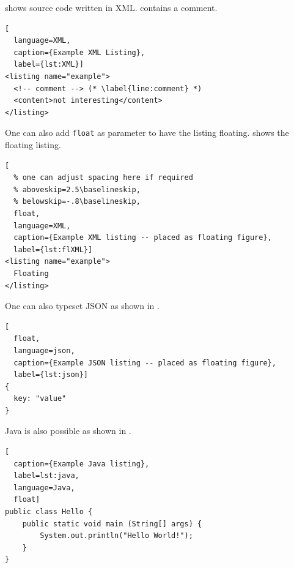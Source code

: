 \begin{ltgexample}
 shows source code written in XML\@.
 contains a comment.

\begin{lstlisting}[
  language=XML,
  caption={Example XML Listing},
  label={lst:XML}]
<listing name="example">
  <!-- comment --> (* \label{line:comment} *)
  <content>not interesting</content>
</listing>
\end{lstlisting}
\end{ltgexample}

One can also add \verb+float+ as parameter to have the listing floating.
 shows the floating listing.

\begin{ltgexample}
\begin{lstlisting}[
  % one can adjust spacing here if required
  % aboveskip=2.5\baselineskip,
  % belowskip=-.8\baselineskip,
  float,
  language=XML,
  caption={Example XML listing -- placed as floating figure},
  label={lst:flXML}]
<listing name="example">
  Floating
</listing>
\end{lstlisting}
\end{ltgexample}

One can also typeset JSON as shown in .

\begin{ltgexample}
\begin{lstlisting}[
  float,
  language=json,
  caption={Example JSON listing -- placed as floating figure},
  label={lst:json}]
{
  key: "value"
}
\end{lstlisting}
\end{ltgexample}

Java is also possible as shown in .

\begin{ltgexample}
\begin{lstlisting}[
  caption={Example Java listing},
  label=lst:java,
  language=Java,
  float]
public class Hello {
    public static void main (String[] args) {
        System.out.println("Hello World!");
    }
}
\end{lstlisting}
\end{ltgexample}

